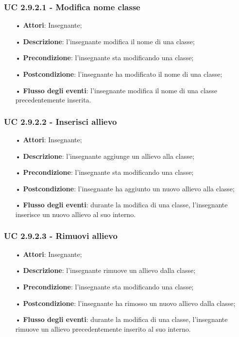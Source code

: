 \subsubsection{UC 2.9.2.1 - Modifica nome classe}
\begin{itemize}
	\item[•] \textbf{Attori}: Insegnante;
	\item[•] \textbf{Descrizione}: l'insegnante modifica il nome di una classe;
	\item[•] \textbf{Precondizione}: l'insegnante sta modificando una classe;
	\item[•] \textbf{Postcondizione}: l'insegnante ha modificato il nome di una classe;
	\item[•] \textbf{Flusso degli eventi}: l'insegnante modifica il nome di una classe precedentemente inserita.
\end{itemize}

\subsubsection{UC 2.9.2.2 - Inserisci allievo}
\begin{itemize}
	\item[•] \textbf{Attori}: Insegnante;
	\item[•] \textbf{Descrizione}: l'insegnante aggiunge un allievo alla classe;
	\item[•] \textbf{Precondizione}: l'insegnante sta modificando una classe;
	\item[•] \textbf{Postcondizione}: l'insegnante ha aggiunto un nuovo allievo alla classe;
	\item[•] \textbf{Flusso degli eventi}: durante la modifica di una classe, l'insegnante inserisce un nuovo allievo al suo interno.
\end{itemize}

\subsubsection{UC 2.9.2.3 - Rimuovi allievo}
\begin{itemize}
	\item[•] \textbf{Attori}: Insegnante;
	\item[•] \textbf{Descrizione}: l'insegnante rimuove un allievo dalla classe;
	\item[•] \textbf{Precondizione}: l'insegnante sta modificando una classe;
	\item[•] \textbf{Postcondizione}: l'insegnante ha rimosso un nuovo allievo dalla classe;
	\item[•] \textbf{Flusso degli eventi}: durante la modifica di una classe, l'insegnante rimuove un allievo precedentemente inserito al suo interno.
\end{itemize}

